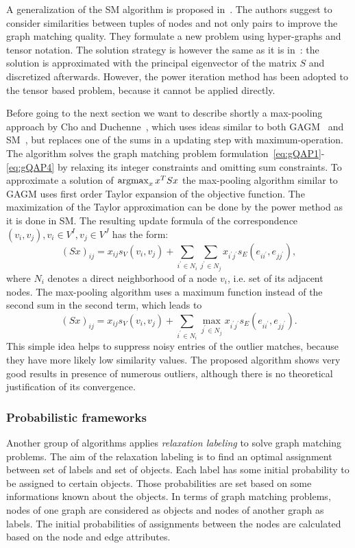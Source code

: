 A generalization of the SM algorithm is proposed in~\cite{Duchenne2011}. The authors suggest to consider similarities between tuples of nodes and not only pairs to improve the graph matching quality. They formulate a new problem using hyper-graphs and tensor notation. The solution strategy is however the same as it is in~\cite{Leordeanu2005_SM}: the solution is approximated with the principal eigenvector of the matrix $S$ and discretized afterwards. However, the power iteration method has been adopted to the tensor based problem, because it cannot be applied directly.

Before going to the next section we want to describe shortly a max-pooling approach by Cho and Duchenne~\cite{Cho2014_Haystack}, which uses ideas similar to both GAGM~\cite{Rangarajan1996_GAGM} and SM~\cite{Leordeanu2005_SM}, but replaces one of the sums in a updating step with maximum-operation. The algorithm solves the graph matching problem formulation~\eqref{eq:gQAP1}-\eqref{eq:gQAP4} by relaxing its integer constraints and omitting sum constraints. To approximate a solution of $\mathop{\rm argmax}_{x}x^TSx$ the max-pooling algorithm similar to GAGM uses first order Taylor expansion of the objective function. The maximization of the Taylor approximation can be done by the power method as it is done in SM.
The resulting update formula of the correspondence $(v_i,v_j),v_i\in V^I,v_j\in V^J$ has the form:
\begin{equation}
(Sx)_{ij}=x_{ij}s_V(v_i,v_{j})+\sum_{i^\prime\in N_i}\sum_{j^\prime\in N_j}x_{i^\prime j^\prime}s_E(e_{ii^\prime},e_{jj^\prime}),
\end{equation}
where $N_i$ denotes a direct neighborhood of a node $v_i$, i.e. set of its adjacent nodes.
The max-pooling algorithm uses a maximum function instead of the second sum in the second term, which leads to
\begin{equation}
(Sx)_{ij}=x_{ij}s_V(v_i,v_{j})+\sum_{i^\prime\in N_i}\max_{j^\prime\in N_j}x_{i^\prime j^\prime}s_E(e_{ii^\prime},e_{jj^\prime}).
\end{equation}
This simple idea helps to suppress noisy entries of the outlier matches, because they have more likely low similarity values. The proposed algorithm shows very good results in presence of numerous outliers, although there is no theoretical justification of its convergence.
\subsubsection{Probabilistic frameworks}
Another group of algorithms applies \emph{relaxation labeling} to solve graph matching problems. The aim of the relaxation labeling is to find an optimal assignment between set of labels and set of objects. Each label has some initial probability to be assigned to certain objects. Those probabilities are set based on some informations known about the objects. In terms of graph matching problems, nodes of one graph are considered as objects and nodes of another graph as labels. The initial probabilities of assignments between the nodes are calculated  based on the node and edge attributes. 

